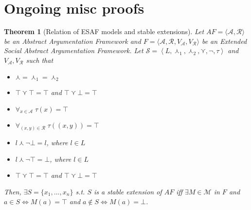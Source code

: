 \documentclass{article}
\newtheorem{theorem}{Theorem}
\newcommand{\args}{\mathcal{A}} %
\newcommand{\att}{\mathcal{R}}  %
\newcommand{\valueset}{L}
\newcommand{\varg}{V_{\args}}   %
\newcommand{\vatt}{V_{\att}}   %
\newcommand{\safid}{F}               %
\newcommand{\saf}{\safid = \safbody} %
\newcommand{\safbody}{\langle \args, \att, \varg, \vatt \rangle} %
\newcommand{\semid}{\mathcal{S}}        %
\newcommand{\sembody}{\left\langle \valueset,\SAFand_1, \SAFand_2,\SAFor,\lnot,\tau \right\rangle}
\newcommand{\semdef}{\semid = \sembody}     %
\newcommand{\SAFand}{\curlywedge}     %
\newcommand{\SAFor}{\curlyvee}        %
\newcommand{\modelset}{\mathcal{M}}   %
\newcommand{\afit}{\textit{AF}}
\newcommand{\af}{\afit = \langle \args, \att \rangle}
\newcommand{\tupd}{\curlywedge}
\newcommand{\tatt}{\curlyvee}
\newcommand{\argarray}{\{x_1, ..., x_n\}}
\begin{document}
\section{Ongoing misc proofs}

\begin{theorem} [Relation of ESAF models and stable extensions]
\label{th:dung}
  Let $\af$ be an Abstract Argumentation Framework and $\saf$ be an Extended Social Abstract Argumentation Framework. Let $\semdef$ and $\varg, \vatt$ such that
  \begin{itemize}
    \item $\SAFand = \SAFand_1 = \SAFand_2$
    \item $\top \tatt \top = \top$ and  $\top \tatt \bot = \top$
    \item $\forall_{x \in \args}\; \tau(x) = \top$
    \item $\forall_{(x, y) \in \att}\; \tau((x,y)) = \top$
    \item $l \tupd \neg \bot = l$, where $l \in L$
    \item $l \tupd \neg \top = \bot$, where $l \in L$
    \item $\top \tatt \top = \top$ and  $\top \tatt \bot = \top$
  \end{itemize}
  
  Then, $\exists S = \argarray$ s.t. $S$ is a stable extension of $\textit{AF}$ iff  $\exists M \in\modelset$ in $F$ and $a \in S \Leftrightarrow M(a) = \top$ and $a \notin S \Leftrightarrow M(a) = \bot$.
\end{theorem}
\end{document}
